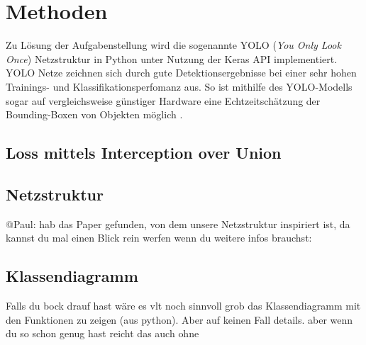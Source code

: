 \section{Methoden}

Zu Lösung der Aufgabenstellung wird die sogenannte YOLO (\textit{You Only Look Once}) Netzstruktur in Python unter Nutzung der Keras API implementiert. YOLO Netze zeichnen sich durch gute Detektionsergebnisse bei einer sehr hohen Trainings- und Klassifikationsperfomanz aus. So ist mithilfe des YOLO-Modells sogar auf vergleichsweise günstiger Hardware eine Echtzeitschätzung der Bounding-Boxen von Objekten möglich \cite{Redmon2016}. 

\subsection{Loss mittels Interception over Union}


\subsection{Netzstruktur}

@Paul: hab das Paper gefunden, von dem unsere Netzstruktur inspiriert ist, da kannst du mal einen Blick rein werfen wenn du weitere infos brauchst: \cite{Redmon2016}

\subsection{Klassendiagramm}
Falls du bock drauf hast wäre es vlt noch sinnvoll grob das Klassendiagramm mit den Funktionen zu zeigen (aus python). Aber auf keinen Fall details. aber wenn du so schon genug hast reicht das auch ohne